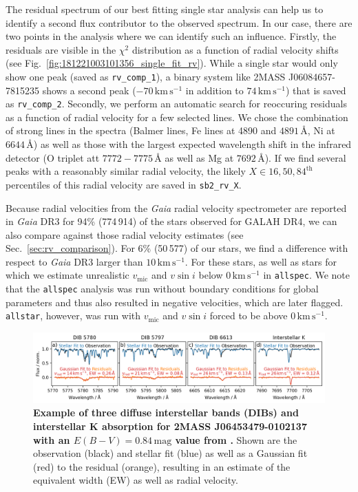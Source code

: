 \documentclass[
  journal=pasa,
  manuscript=research-paper, %
  year=2024,
  volume=37
]{cup-journal}
\newcommand{\vmic}{$v_\mathrm{mic}$\xspace}
\newcommand{\vsini}{$v \sin i$\xspace}
\newcommand{\Gaia}{\textit{Gaia}\xspace}
\begin{document}
The residual spectrum of our best fitting single star analysis can help us to identify a second flux contributor to the observed spectrum. In our case, there are two points in the analysis where we can identify such an influence. Firstly, the residuals are visible in the $\chi^2$ distribution as a function of radial velocity shifts (see Fig.~\ref{fig:181221003101356_single_fit_rv}). While a single star would only show one peak (saved as \texttt{rv\_comp\_1}), a binary system like 2MASS J06084657-7815235 shows a second peak ($-70\,\mathrm{km\,s^{-1}}$ in addition to $74\,\mathrm{km\,s^{-1}}$) that is saved as \texttt{rv\_comp\_2}. Secondly, we perform an automatic search for reoccuring residuals as a function of radial velocity for a few selected lines. We chose the combination of strong lines in the spectra (Balmer lines, Fe lines at 4890 and $4891\,\text{\AA}$, Ni at $6644\,\text{\AA}$) as well as those with the largest expected wavelength shift in the infrared detector (O triplet att $7772-7775\,\text{\AA}$ as well as Mg at $7692\,\text{\AA}$). If we find several peaks with a reasonably similar radial velocity, the likely $X \in {16,50,84}^\text{th}$ percentiles of this radial velocity are saved in \texttt{sb2\_rv\_X}.

Because radial velocities from the \Gaia radial velocity spectrometer \citep{Katz2023} are reported in \Gaia DR3 for 94\% (774\,914) of the stars observed for GALAH DR4, we can also compare against those radial velocity estimates (see Sec.~\ref{sec:rv_comparison}). For 6\% (50\,577) of our stars, we find a difference with respect to \Gaia DR3 larger than $10\,\mathrm{km\,s^{-1}}$. For these stars, as well as stars for which we estimate unrealistic \vmic and \vsini below $0\,\mathrm{km\,s^{-1}}$ in \texttt{allspec}. We note that the \texttt{allspec} analysis was run without boundary conditions for global parameters and thus also resulted in negative velocities, which are later flagged. \texttt{allstar}, however, was run with \vmic and \vsini forced to be above $0\,\mathrm{km\,s^{-1}}$.



\begin{figure}[ht]
 \centering
 \includegraphics[width=\textwidth]{figures/example_dibs_06453479-0102137.png}
 \caption{\textbf{Example of three diffuse interstellar bands (DIBs) and interstellar K absorption for 2MASS J06453479-0102137 with an $E(B-V) = 0.84\,\mathrm{mag}$ value from \citet{Schlegel1998}.} Shown are the observation (black) and stellar fit (blue) as well as a Gaussian fit (red) to the residual (orange), resulting in an estimate of the equivalent width (EW) as well as radial velocity.} %
 \label{fig:example_dibs_06453479-0102137}
\end{figure}
\end{document}
